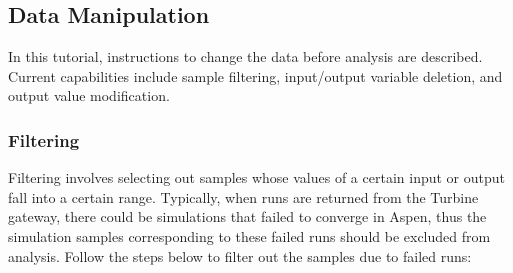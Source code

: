 \subsection{Data Manipulation}

In this tutorial, instructions to change the data before analysis are
described. Current capabilities include sample filtering, input/output
variable deletion, and output value modification.

\subsubsection{Filtering}

Filtering involves selecting out samples whose values of a certain input or output fall into a certain range. Typically, when runs are returned from the Turbine gateway, there could be simulations that failed to converge in Aspen, thus the simulation samples corresponding to these failed runs should be excluded from analysis. Follow the steps below to filter out the samples due to failed runs:
